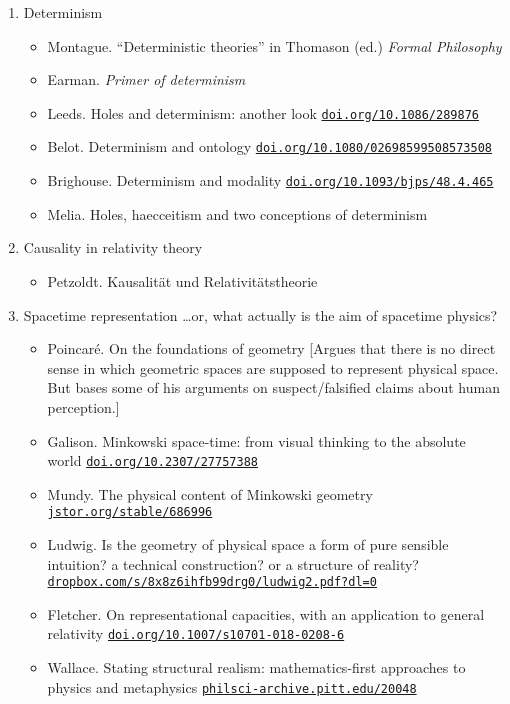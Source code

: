 \documentclass[11pt]{article}
\newcommand\rurl[1]{%
  \href{http://#1}{\nolinkurl{#1}}%
}
\begin{document}
\begin{enumerate}
\item Determinism
  \begin{itemize}
  \item Montague. ``Deterministic theories'' in Thomason (ed.)
    \textit{Formal Philosophy}
  \item Earman. \textit{Primer of determinism}
  \item Leeds. Holes and determinism: another look
    \rurl{doi.org/10.1086/289876}
  \item Belot. Determinism and ontology
    \rurl{doi.org/10.1080/02698599508573508}
  \item Brighouse. Determinism and modality
    \rurl{doi.org/10.1093/bjps/48.4.465}
  \item Melia. Holes, haecceitism and two conceptions of determinism 
  \end{itemize}

\item Causality in relativity theory
  \begin{itemize}
  \item Petzoldt. Kausalit{\"a}t und Relativit{\"a}tstheorie
  \end{itemize}

\item Spacetime representation \dots or, what actually is the aim of
  spacetime physics?
  \begin{itemize}
  \item Poincar{\'e}. On the foundations of geometry [Argues that
    there is no direct sense in which geometric spaces are supposed to
    represent physical space. But bases some of his arguments on
    suspect/falsified claims about human perception.]
  \item Galison. Minkowski space-time: from visual thinking to the
    absolute world \rurl{doi.org/10.2307/27757388}
  \item Mundy. The physical content of Minkowski geometry
    \rurl{jstor.org/stable/686996}
  \item Ludwig. Is the geometry of physical space a form of pure
    sensible intuition? a technical construction? or a structure of
    reality?  \rurl{dropbox.com/s/8x8z6ihfb99drg0/ludwig2.pdf?dl=0}
  \item Fletcher. On representational capacities, with an application
    to general relativity \rurl{doi.org/10.1007/s10701-018-0208-6}
  \item Wallace. Stating structural realism: mathematics-first
    approaches to physics and metaphysics
    \rurl{philsci-archive.pitt.edu/20048}
  \end{itemize}



\end{enumerate}
\end{document}

